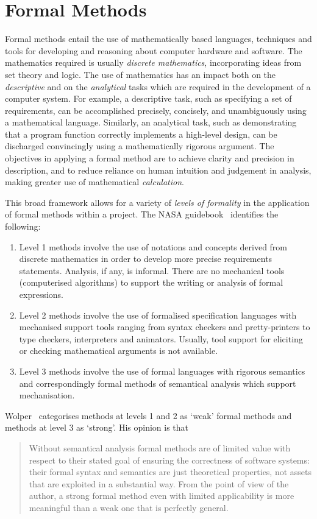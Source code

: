 \section{Formal Methods}
Formal methods entail the use of mathematically based languages,
techniques and tools for developing and reasoning about computer
hardware and software. The mathematics required is usually \emph{discrete
mathematics}, incorporating ideas from set theory and logic. The use of
mathematics has an impact both on the \emph{descriptive} and on the 
\emph{analytical} tasks which are required in the development of a computer 
system. For example, a descriptive task, such as specifying a set of
requirements, can be accomplished precisely, concisely, and
unambiguously using a mathematical language. Similarly, an analytical
task, such as demonstrating that a program function correctly
implements a high-level design, can be discharged convincingly using a
mathematically rigorous argument.  The objectives in applying a formal
method are to achieve clarity and precision in description, and to
reduce reliance on human intuition and judgement in analysis, making
greater use of mathematical \emph{calculation}.

This broad framework allows for a variety of \emph{levels of formality} in
the application of formal methods within a project. The NASA
guidebook~\cite{nas:97} identifies the following:
\begin{enumerate}
\item Level 1 methods involve the use of notations and concepts derived from 
discrete mathematics in order to develop more precise requirements
statements. Analysis, if any, is informal. There are no mechanical
tools (computerised algorithms) to support the writing or analysis of formal
expressions.
\item Level 2 methods involve the use of formalised specification languages 
with mechanised support tools ranging from syntax checkers and
pretty-printers to type checkers, interpreters and animators. Usually,
tool support for eliciting or checking mathematical arguments is not
available.
\item Level 3 methods involve the use of formal languages with rigorous 
semantics and correspondingly formal methods of semantical analysis
which support mechanisation.
\end{enumerate}
Wolper~\cite{wol:97} categorises methods at levels 1 and 2 as `weak'
formal methods and methods at level 3 as `strong'. His opinion is that
\begin{quote}
Without semantical analysis formal methods are of limited value with 
respect to their stated goal of ensuring the correctness of software
systems: their formal syntax and semantics are just theoretical properties,
not assets that are exploited in a substantial way. From the point of view of 
the author, a strong formal method even with limited applicability is more 
meaningful than a weak one that is perfectly general.
\end{quote}  

